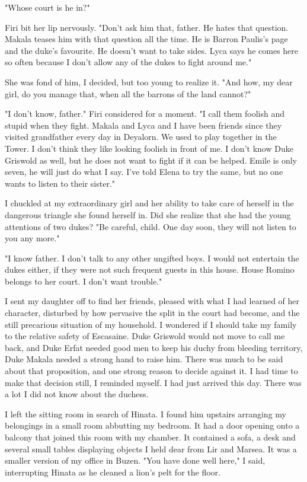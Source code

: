 \documentclass{article}
\begin{document}
"Whose court is he in?"

Firi bit her lip nervously. "Don't ask him that, father. He hates that question. Makala teases him with that question all the time. He is Barron Paulis's page and the duke's favourite. He doesn't want to take sides. Lyca says he comes here so often because I don't allow any of the dukes to fight around me."

She was fond of him, I decided, but too young to realize it. "And how, my dear girl, do you manage that, when all the barrons of the land cannot?"

"I don't know, father." Firi considered for a moment. "I call them foolish and stupid when they fight. Makala and Lyca and I have been friends since they visited grandfather every day in Deyalorn. We used to play together in the Tower. I don't think they like looking foolish in front of me. I don't know Duke Griswold as well, but he does not want to fight if it can be helped. Emile is only seven, he will just do what I say. I've told Elena to try the same, but no one wants to listen to their sister."

I chuckled at my extraordinary girl and her ability to take care of herself in the dangerous triangle she found herself in. Did she realize that she had the young attentions of two dukes? "Be careful, child. One day soon, they will not listen to you any more."

"I know father. I don't talk to any other ungifted boys. I would not entertain the dukes either, if they were not such frequent guests in this house. House Romino belongs to her court. I don't want trouble."

I sent my daughter off to find her friends, pleased with what I had learned of her character, disturbed by how pervasive the split in the court had become, and the still precarious situation of my household. I wondered if I should take my family to the relative safety of Escasaine. Duke Griswold would not move to call me back, and Duke Erfat needed good men to keep his duchy from bleeding territory, Duke Makala needed a strong hand to raise him. There was much to be said about that proposition, and one strong reason to decide against it. I had time to make that decision still, I reminded myself. I had just arrived this day. There was a lot I did not know about the duchess.

I left the sitting room in search of Hinata. I found him upstairs arranging my belongings in a small room abbutting my bedroom. It had a door opening onto a balcony that joined this room with my chamber. It contained a sofa, a desk and several small tables displaying objects I held dear from Lir and Marsea. It was a smaller version of my office in Buzen. "You have done well here," I said, interrupting Hinata as he cleaned a lion's pelt for the floor. 
\end{document}
